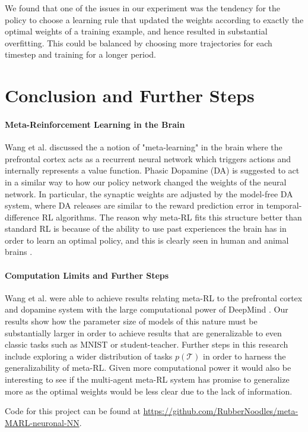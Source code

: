 \documentclass{article}
\begin{document}
We found that one of the issues in our experiment was the tendency for the policy to choose a 
learning rule that updated the weights according to exactly the optimal weights of a training example, 
and hence resulted in substantial overfitting. This could be balanced
by choosing more trajectories for each timestep and training for a longer period. 
\section{Conclusion and Further Steps}

\paragraph{Meta-Reinforcement Learning in the Brain} Wang et al. discussed the 
a notion of "meta-learning" in the brain where the prefrontal cortex acts as a recurrent neural network which triggers actions
and internally represents a value function. Phasic Dopamine (DA) is suggested to act in a similar way to
how our policy network changed the weights of the neural network. In particular, the synaptic weights are adjusted
by the model-free DA system, where DA releases are similar to the reward prediction error in temporal-difference 
RL algorithms. The reason why meta-RL fits this structure better than standard RL is because of the ability to use past 
experiences the brain has in order to learn an optimal policy, and this is clearly seen in human and animal brains \cite{wang2018pfc}.

\paragraph{Computation Limits and Further Steps} Wang et al. were able to achieve results relating meta-RL to the prefrontal cortex and 
dopamine system with the large computational power of DeepMind \cite{wang2018pfc}. 
Our results show how the parameter size of models of this nature must be substantially 
larger in order to achieve results that are generalizable to even classic tasks such as
MNIST or student-teacher. Further steps in this research include exploring a wider distribution
of tasks $p(\mathcal{T})$ in order to harness the generalizability of meta-RL. Given more computational
power it would also be interesting to see if the multi-agent meta-RL system has promise to generalize
more as the optimal weights would be less clear due to the lack of information.

Code for this project can be found at \url{https://github.com/RubberNoodles/meta-MARL-neuronal-NN}.

 
\end{document}
